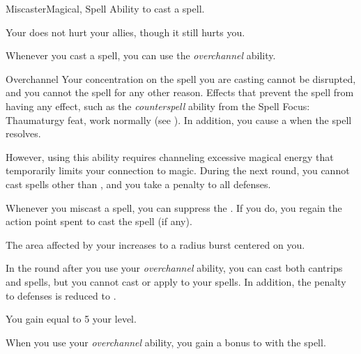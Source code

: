     \begin{feat}{Miscaster}{Magical, Spell}
        \featpre Ability to cast a spell.

         Your  does not hurt your allies, though it still hurts you.

         Whenever you cast a spell, you can use the \textit{overchannel} ability.
        \begin{ability}{Overchannel}
            Your concentration on the spell you are casting cannot be disrupted, and you cannot  the spell for any other reason.
            Effects that prevent the spell from having any effect, such as the \textit{counterspell} ability from the Spell Focus: Thaumaturgy feat, work normally (see ).
            In addition, you cause a  when the spell resolves.

            However, using this ability requires channeling excessive magical energy that temporarily limits your connection to magic.
            During the next round, you cannot cast spells other than , and you take a  penalty to all defenses.
        \end{ability}

         Whenever you miscast a spell, you can suppress the .
        If you do, you regain the action point spent to cast the spell (if any).

         The area affected by your  increases to a \areamed radius burst centered on you.

         In the round after you use your \textit{overchannel} ability, you can cast both cantrips and spells, but you cannot cast  or apply  to your spells.
        In addition, the penalty to defenses is reduced to .

         You gain  equal to 5 \add your level.

         When you use your \textit{overchannel} ability, you gain a  bonus to  with the spell.
    \end{feat}

